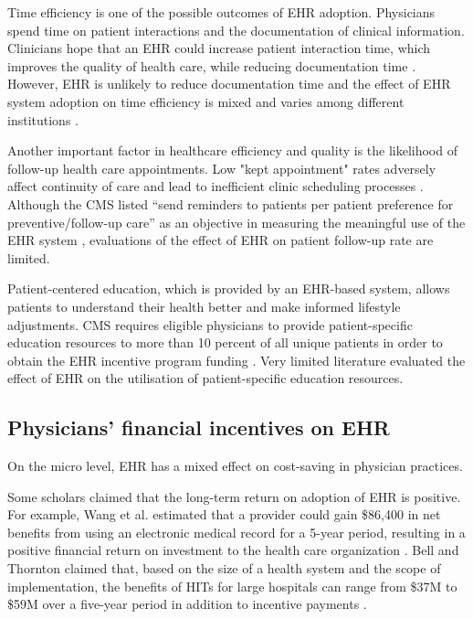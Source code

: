 \documentclass[12pt]{report}
\begin{document}
Time efficiency is one of the possible outcomes of EHR adoption. Physicians spend time on patient interactions and the documentation of clinical information. Clinicians hope that an EHR could increase patient interaction time, which improves the quality of health care, while reducing documentation time \citep{leung2003incentives}. However, EHR is unlikely to reduce documentation time \citep{poissant2005impact} and the effect of EHR system adoption on time efficiency is mixed and varies among different institutions \citep{Chaudhry2006}.

Another important factor in healthcare efficiency and quality is the likelihood of follow-up health care appointments. Low "kept appointment" rates adversely affect continuity of care and lead to inefficient clinic scheduling processes \citep{myers2001strategies}. Although the CMS listed ``send reminders to patients per patient preference for preventive/follow-up care'' as an objective in measuring the meaningful use of the EHR system \citep{cmsincentive14}, evaluations of the effect of EHR on patient follow-up rate are limited.

Patient-centered education, which is provided by an EHR-based system, allows patients to understand their health better and make informed lifestyle adjustments. CMS requires eligible physicians to provide patient-specific education resources to more than 10 percent of all unique patients in order to obtain the EHR incentive program funding \citep{healthit05}. Very limited literature evaluated the effect of EHR on the utilisation of patient-specific education resources. 

\subsection{Physicians' financial incentives on EHR}
On the micro level, EHR has a mixed effect on cost-saving in physician practices.

Some scholars claimed that the long-term return on adoption of EHR is positive. For example, Wang et al. estimated that a provider could gain \$86,400 in net benefits from using an electronic medical record for a 5-year period, resulting in a positive financial return on investment to the health care organization \citep{Wang2003}. Bell and Thornton claimed that, based on the size of a health system and the scope of implementation, the benefits of HITs for large hospitals can range from \$37M to \$59M over a five-year period in addition to incentive payments \citep{Bell2011}.
\end{document}
